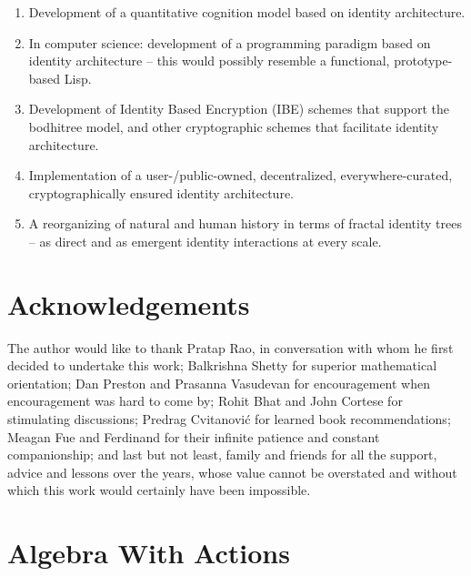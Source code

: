 \documentclass[pra,twocolumn,groupedaddress,10pt]{revtex4}
\theoremstyle{definition}
\begin{document}
\begin{enumerate}
	\item Development of a quantitative cognition model based on identity architecture.
	\item In computer science: development of a programming paradigm based on identity architecture -- this would possibly resemble a functional, prototype-based Lisp.
	\item Development of Identity Based Encryption (IBE) schemes that support the bodhitree model, and other cryptographic schemes that facilitate identity architecture.
	\item Implementation of a user-/public-owned, decentralized, everywhere-curated, cryptographically ensured identity architecture.
	\item A reorganizing of natural and human history in terms of fractal identity trees -- as direct and as emergent identity interactions at every scale.
\end{enumerate}

\section{Acknowledgements} \label{sec:acknowledgements}

The author would like to thank Pratap Rao, in conversation with whom he first decided to undertake this work; Balkrishna Shetty for superior mathematical orientation; Dan Preston and Prasanna Vasudevan for encouragement when encouragement was hard to come by; Rohit Bhat and John Cortese for stimulating discussions; Predrag Cvitanovi\'{c} for learned book recommendations; Meagan Fue and Ferdinand for their infinite patience and constant companionship; and last but not least, family and friends for all the support, advice and lessons over the years, whose value cannot be overstated and without which this work would certainly have been impossible.




\appendix

\section{Algebra With Actions} \label{app:algact}
\end{document}
